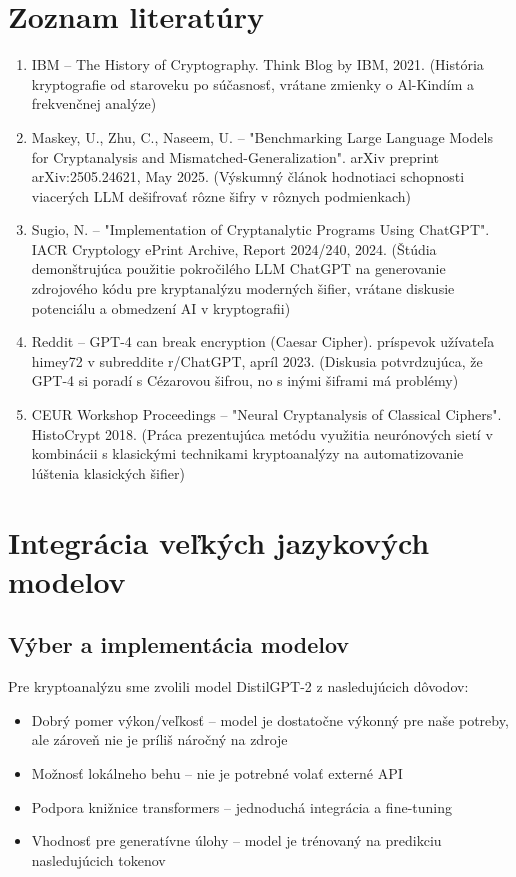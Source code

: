 \documentclass[12pt,a4paper]{article}
\begin{document}
\section{Zoznam literatúry}
\begin{enumerate}
    \item IBM -- The History of Cryptography. Think Blog by IBM, 2021. (História kryptografie od staroveku po súčasnosť, vrátane zmienky o Al-Kindím a frekvenčnej analýze)

    \item Maskey, U., Zhu, C., Naseem, U. -- "Benchmarking Large Language Models for Cryptanalysis and Mismatched-Generalization". arXiv preprint arXiv:2505.24621, May 2025. (Výskumný článok hodnotiaci schopnosti viacerých LLM dešifrovať rôzne šifry v rôznych podmienkach)

    \item Sugio, N. -- "Implementation of Cryptanalytic Programs Using ChatGPT". IACR Cryptology ePrint Archive, Report 2024/240, 2024. (Štúdia demonštrujúca použitie pokročilého LLM ChatGPT na generovanie zdrojového kódu pre kryptanalýzu moderných šifier, vrátane diskusie potenciálu a obmedzení AI v kryptografii)

    \item Reddit -- GPT-4 can break encryption (Caesar Cipher). príspevok užívateľa himey72 v subreddite r/ChatGPT, apríl 2023. (Diskusia potvrdzujúca, že GPT-4 si poradí s Cézarovou šifrou, no s inými šiframi má problémy)

    \item CEUR Workshop Proceedings -- "Neural Cryptanalysis of Classical Ciphers". HistoCrypt 2018. (Práca prezentujúca metódu využitia neurónových sietí v kombinácii s klasickými technikami kryptoanalýzy na automatizovanie lúštenia klasických šifier)
\end{enumerate}

\section{Integrácia veľkých jazykových modelov}
\subsection{Výber a implementácia modelov}
Pre kryptoanalýzu sme zvolili model DistilGPT-2 z nasledujúcich dôvodov:
\begin{itemize}
    \item Dobrý pomer výkon/veľkosť -- model je dostatočne výkonný pre naše potreby, ale zároveň nie je príliš náročný na zdroje
    \item Možnosť lokálneho behu -- nie je potrebné volať externé API
    \item Podpora knižnice transformers -- jednoduchá integrácia a fine-tuning
    \item Vhodnosť pre generatívne úlohy -- model je trénovaný na predikciu nasledujúcich tokenov
\end{itemize}
\end{document}
